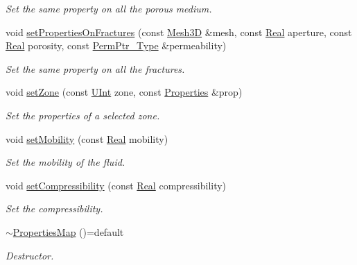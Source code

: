 \begin{DoxyCompactItemize}
\begin{DoxyCompactList}\small\item\em Set the same property on all the porous medium. \end{DoxyCompactList}\item 
void \hyperlink{classFVCode3D_1_1PropertiesMap_a3289bc66bb640670a35cd79a7577488d}{set\+Properties\+On\+Fractures} (const \hyperlink{classFVCode3D_1_1Mesh3D}{Mesh3D} \&mesh, const \hyperlink{namespaceFVCode3D_a40c1f5588a248569d80aa5f867080e83}{Real} aperture, const \hyperlink{namespaceFVCode3D_a40c1f5588a248569d80aa5f867080e83}{Real} porosity, const \hyperlink{namespaceFVCode3D_aee5ae48a57366603109f90f526a645b1}{Perm\+Ptr\+\_\+\+Type} \&permeability)
\begin{DoxyCompactList}\small\item\em Set the same property on all the fractures. \end{DoxyCompactList}\item 
void \hyperlink{classFVCode3D_1_1PropertiesMap_ac303adadd1101e7bee62ecad0e8ea6ac}{set\+Zone} (const \hyperlink{namespaceFVCode3D_a4bf7e328c75d0fd504050d040ebe9eda}{U\+Int} zone, const \hyperlink{classFVCode3D_1_1Properties}{Properties} \&prop)
\begin{DoxyCompactList}\small\item\em Set the properties of a selected zone. \end{DoxyCompactList}\item 
void \hyperlink{classFVCode3D_1_1PropertiesMap_a130615880aea53aecc331634de3a2d16}{set\+Mobility} (const \hyperlink{namespaceFVCode3D_a40c1f5588a248569d80aa5f867080e83}{Real} mobility)
\begin{DoxyCompactList}\small\item\em Set the mobility of the fluid. \end{DoxyCompactList}\item 
void \hyperlink{classFVCode3D_1_1PropertiesMap_abe59b6519ad1e67b62f2c7136b064a2d}{set\+Compressibility} (const \hyperlink{namespaceFVCode3D_a40c1f5588a248569d80aa5f867080e83}{Real} compressibility)
\begin{DoxyCompactList}\small\item\em Set the compressibility. \end{DoxyCompactList}\item 
\hyperlink{classFVCode3D_1_1PropertiesMap_a2ebf1ac700a0b90d9ac5a27c26eafd8c}{$\sim$\+Properties\+Map} ()=default
\begin{DoxyCompactList}\small\item\em Destructor. \end{DoxyCompactList}\end{DoxyCompactItemize}
